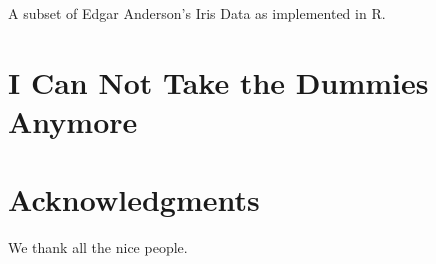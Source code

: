 \begin{multicols}{2}
\begin{supplTable*}[!b]
\centering
\captionsetup{width=.9\linewidth}
\caption[Subset of Anderson's Iris Data]{\label{tab:c2st1}
A subset of Edgar Anderson's Iris Data as implemented in R.}
\begin{small}

\end{small}
\end{supplTable*}

\section{I Can Not Take the Dummies Anymore}
\textcolor{black!35}{\lipsum[10-11]}

\section*{Acknowledgments}

We thank all the nice people.

\end{multicols}
